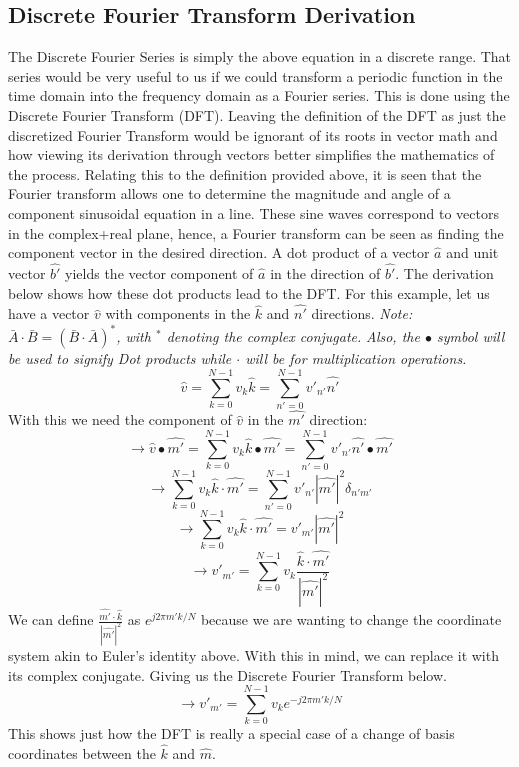 \documentclass[12pt]{article}
\begin{document}
\subsection{Discrete Fourier Transform Derivation}
 The Discrete Fourier Series is simply the above equation in a discrete range. That series would be very useful to us if we could transform a periodic function in the time domain into the frequency domain as a Fourier series. This is done using the Discrete Fourier Transform (DFT). Leaving the definition of the DFT as just the discretized Fourier Transform would be ignorant of its roots in vector math and how viewing its derivation through vectors better simplifies the mathematics of the process. Relating this to the definition provided above, it is seen that the Fourier transform allows one to determine the magnitude and angle of a component sinusoidal equation in a line. These sine waves correspond to vectors in the complex+real plane, hence, a Fourier transform can be seen as finding the component vector in the desired direction. A dot product of a vector $\widehat{a}$ and unit vector $\widehat{b'}$ yields the vector component of $\hat{a}$ in the direction of $\widehat{b'}$. The derivation below shows how these dot products lead to the DFT. For this example, let us have a vector $\widehat{v}$ with components in the $\widehat{k}$ and $\widehat{n'}$ directions. \textit{Note: $\bar{A} \cdot \bar{B} = (\bar{B} \cdot \bar{A})^*$, with $^*$ denoting the complex conjugate.} \textit{Also, the $\bullet$ symbol will be used to signify Dot products while $\cdot$ will be for multiplication operations. } $$\widehat{v} = \sum_{k=0}^{N-1} v_k \widehat{k} = \sum_{n'=0}^{N-1} v'_{n'} \widehat{n'} $$
 With this we need the component of $\hat{v}$ in the $\widehat{m'}$ direction: $$\rightarrow \hat{v} \bullet \widehat{m'} = \sum_{k=0}^{N-1} v_k \widehat{k} \bullet \widehat{m'} = \sum_{n'=0}^{N-1}v'_{n'} \widehat{n'} \bullet \widehat{m'}  $$ $$\rightarrow \sum_{k=0}^{N-1} v_k \widehat{k} \cdot \widehat{m'} = \sum_{n'=0}^{N-1} v'_{n'} |\widehat{m'}|^2 \delta_{n'm'}$$
 $$\rightarrow \sum_{k=0}^{N-1} v_k \widehat{k} \cdot \widehat{m'} = v'_{m'} |\widehat{m'}|^2 $$ $$ \rightarrow v'_{m'} = \sum_{k=0}^{N-1} v_k \frac {\widehat{k} \cdot \widehat{m'} }{|\widehat{m'}|^2} $$
 We can define $\frac {\widehat{m'} \cdot \widehat{k} }{|\widehat{m'}|^2}$ as $e^{j2\pi m'k/N}$ because we are wanting to change the coordinate system akin to Euler's identity above. With this in mind, we can replace it with its complex conjugate. Giving us the Discrete Fourier Transform below. $$\rightarrow v'_{m'} = \sum_{k=0}^{N-1} v_k e^{-j2\pi m'k/N} $$
This shows just how the DFT is really a special case of a change of basis coordinates between the $\widehat{k}$ and $\widehat{m}$.
\end{document}
